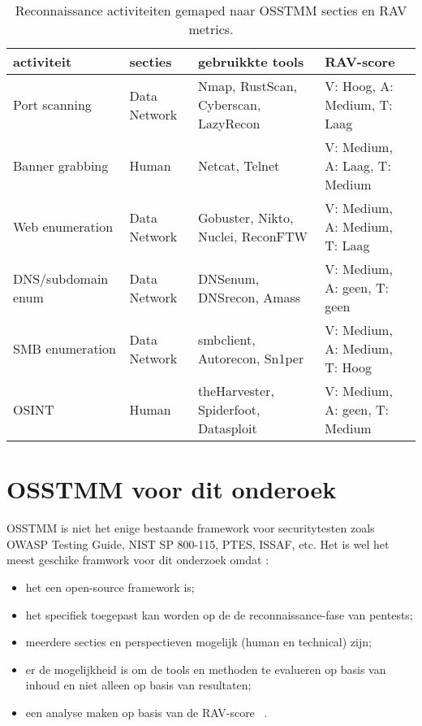 \begin{table}[H]
  \centering
  \footnotesize
  \begin{tabularx}{\linewidth}{l l X l}
    \toprule
    \textbf{activiteit} & \textbf{secties} & \textbf{gebruikkte tools} & \textbf{RAV-score} \\
    \midrule
    Port scanning       & Data Network & Nmap, RustScan, Cyberscan, LazyRecon & V: Hoog,   A: Medium, T: Laag \\
    Banner grabbing     & Human        & Netcat, Telnet                       & V: Medium, A: Laag,   T: Medium \\
    Web enumeration     & Data Network & Gobuster, Nikto, Nuclei, ReconFTW    & V: Medium, A: Medium, T: Laag \\
    DNS/subdomain enum  & Data Network & DNSenum, DNSrecon, Amass             & V: Medium, A: geen,   T: geen \\
    SMB enumeration     & Data Network & smbclient, Autorecon, Sn1per         & V: Medium, A: Medium, T: Hoog \\
    OSINT               & Human        & theHarvester, Spiderfoot, Datasploit & V: Medium, A: geen,   T: Medium \\
    \bottomrule
  \end{tabularx}
  \caption[activiteieten in OSSTMM]{\label{tab:recon}Reconnaissance activiteiten gemaped naar OSSTMM secties en RAV metrics.}
\end{table}

\section{OSSTMM voor dit onderoek}

OSSTMM is niet het enige bestaande framework voor securitytesten zoals OWASP Testing Guide, NIST SP 800-115, PTES, ISSAF, etc.
Het is wel het meest geschike framwork voor dit onderzoek omdat :

\begin{itemize}
  \item het een open-source framework is;
  \item het specifiek toegepast kan worden op de de reconnaissance-fase van pentests;
  \item meerdere secties en perspectieven mogelijk (human en technical) zijn;
  \item er de mogelijkheid is om de tools en methoden te evalueren op basis van inhoud en niet alleen op basis van resultaten;
  \item een analyse maken op basis van de RAV-score ~\autocite{Herzog}.
\end{itemize}


